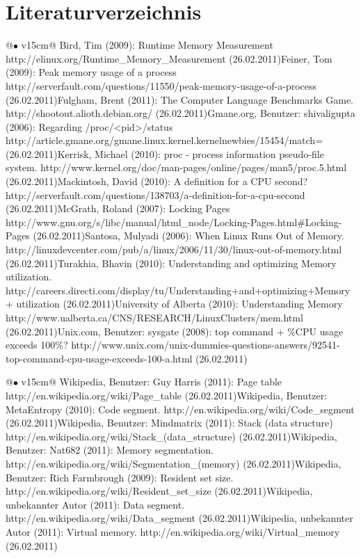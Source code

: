 \documentclass{fancydocument}
\begin{document}
\section{Literaturverzeichnis}
\noindent
\begin{tabularx}{\linewidth}{@{$\bullet$  }v{15cm}@{}}
Bird, Tim (2009): Runtime Memory Measurement
http://elinux.org/Runtime\_Memory\_Measurement (26.02.2011)\tabularnewline[3pt]
Feiner, Tom (2009): Peak memory usage of a process
http://serverfault.com/questions/11550/peak-memory-usage-of-a-process (26.02.2011)\tabularnewline[3pt]
Fulgham, Brent (2011): The Computer Language Benchmarks Game.
http://shootout.alioth.debian.org/ (26.02.2011)\tabularnewline[3pt]
Gmane.org, Benutzer: shivaligupta (2006): Regarding /proc/<pid>/status
http://article.gmane.org/gmane.linux.kernel.kernelnewbies/15454/match= (26.02.2011)\tabularnewline[3pt]
Kerrisk, Michael (2010): proc - process information pseudo-file system.
http://www.kernel.org/doc/man-pages/online/pages/man5/proc.5.html (26.02.2011)\tabularnewline[3pt]
Mackintosh, David (2010): A definition for a CPU second?
http://serverfault.com/questions/138703/a-definition-for-a-cpu-second (26.02.2011)\tabularnewline[3pt]
McGrath, Roland (2007): Locking Pages
http://www.gnu.org/s/libc/manual/html\_node/Locking-Pages.html#Locking-Pages (26.02.2011)\tabularnewline[3pt]
Santosa, Mulyadi (2006): When Linux Runs Out of Memory.
http://linuxdevcenter.com/pub/a/linux/2006/11/30/linux-out-of-memory.html (26.02.2011)\tabularnewline[3pt]
Turakhia, Bhavin (2010): Understanding and optimizing Memory utilization.
http://careers.directi.com/display/tu/Understanding+and+optimizing+Memory+ utilization (26.02.2011)\tabularnewline[3pt]
University of Alberta (2010): Understanding Memory
http://www.ualberta.ca/CNS/RESEARCH/LinuxClusters/mem.html (26.02.2011)\tabularnewline[3pt]
Unix.com, Benutzer: sysgate (2008): top command + \%CPU usage exceeds 100\%?
http://www.unix.com/unix-dummies-questions-answers/92541-top-command-cpu-usage-exceeds-100-a.html (26.02.2011)\tabularnewline[3pt]
\end{tabularx}
\newpage
\noindent
\begin{tabularx}{\linewidth}{@{$\bullet$  }v{15cm}@{}}
Wikipedia, Benutzer: Guy Harris (2011): Page table
http://en.wikipedia.org/wiki/Page\_table (26.02.2011)\tabularnewline[3pt]
Wikipedia, Benutzer: MetaEntropy (2010): Code segment.
http://en.wikipedia.org/wiki/Code\_segment (26.02.2011)\tabularnewline[3pt]
Wikipedia, Benutzer: Mindmatrix (2011): Stack (data structure)
http://en.wikipedia.org/wiki/Stack\_(data\_structure) (26.02.2011)\tabularnewline[3pt]
Wikipedia, Benutzer: Nat682 (2011): Memory segmentation.
http://en.wikipedia.org/wiki/Segmentation\_(memory) (26.02.2011)\tabularnewline[3pt]
Wikipedia, Benutzer: Rich Farmbrough (2009): Resident set size.
http://en.wikipedia.org/wiki/Resident\_set\_size (26.02.2011)\tabularnewline[3pt]
Wikipedia, unbekannter Autor (2011): Data segment.
http://en.wikipedia.org/wiki/Data\_segment (26.02.2011)\tabularnewline[3pt]
Wikipedia, unbekannter Autor (2011): Virtual memory.
http://en.wikipedia.org/wiki/Virtual\_memory (26.02.2011)\tabularnewline[3pt]
\end{tabularx}
\end{document}
